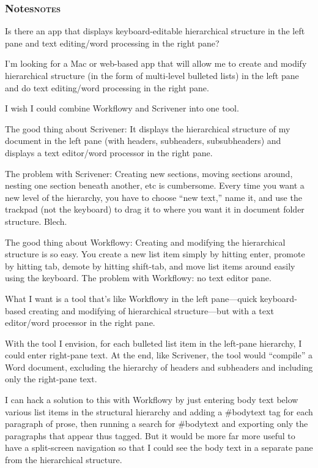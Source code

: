 \documentclass[11pt]{article}
\begin{document}
\subsubsection{Notes\hfill{}\textsc{notes}}
\label{sec:orgheadline19}
Is there an app that displays keyboard-editable hierarchical structure in the left pane and text editing/word processing in the right pane?

I'm looking for a Mac or web-based app that will allow me to create and modify hierarchical structure (in the form of multi-level bulleted lists) in the left pane and do text editing/word processing in the right pane.

I wish I could combine Workflowy and Scrivener into one tool.

The good thing about Scrivener: It displays the hierarchical structure of my document in the left pane (with headers, subheaders, subsubheaders) and displays a text editor/word processor in the right pane.

The problem with Scrivener: Creating new sections, moving sections around, nesting one section beneath another, etc is cumbersome. Every time you want a new level of the hierarchy, you have to choose ``new text,'' name it, and use the trackpad (not the keyboard) to drag it to where you want it in document folder structure. Blech.

The good thing about Workflowy: Creating and modifying the hierarchical structure is so easy. You create a new list item simply by hitting enter, promote by hitting tab, demote by hitting shift-tab, and move list items around easily using the keyboard. The problem with Workflowy: no text editor pane.

What I want is a tool that's like Workflowy in the left pane---quick keyboard-based creating and modifying of hierarchical structure---but with a text editor/word processor in the right pane.

With the tool I envision, for each bulleted list item in the left-pane hierarchy, I could enter right-pane text. At the end, like Scrivener, the tool would ``compile'' a Word document, excluding the hierarchy of headers and subheaders and including only the right-pane text.

I can hack a solution to this with Workflowy by just entering body text below various list items in the structural hierarchy and adding a \#bodytext tag for each paragraph of prose, then running a search for \#bodytext and exporting only the paragraphs that appear thus tagged. But it would be more far more useful to have a split-screen navigation so that I could see the body text in a separate pane from the hierarchical structure.
\end{document}
